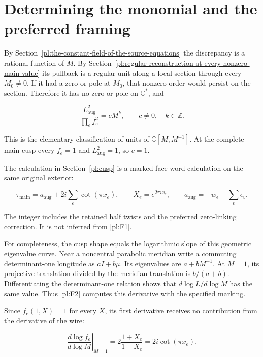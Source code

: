 \section{Determining the monomial and the preferred framing}\label{pl:determining-the-monomial-and-the-preferred-framing}

By Section~\ref{pl:the-constant-field-of-the-source-equations} the discrepancy is a rational function of \(M\).
By Section~\ref{pl:regular-reconstruction-at-every-nonzero-main-value} its pullback is a regular unit along a local section
through every \(M_0\ne0\). If it had a zero or pole at \(M_0\),
that nonzero order would persist on the section. Therefore it has
no zero or pole on \(\mathbb C^*\), and

\begin{equation}\label{pl:F1}
\frac{L_{\mathrm{aug}}^2}{\prod_e f_e^2}=cM^k,\qquad
                  c\ne0,\quad k\in\mathbb Z.
\end{equation}

This is the elementary classification of units of
\(\mathbb C[M,M^{-1}]\). At the complete main cusp every
\(f_e=1\) and \(L_{\mathrm{aug}}^2=1\), so \(c=1\).

The calculation in Section~\ref{pl:cusp} is a marked face-word calculation on the same original exterior:

\begin{equation}\label{pl:F2}
\tau_{\mathrm{main}}
      =a_{\mathrm{aug}}+2i\sum_e\cot(\pi x_e),\qquad
 X_e=e^{2\pi ix_e},\qquad
 a_{\mathrm{aug}}=-w_\epsilon-\sum_v\epsilon_v.
\end{equation}

The integer includes the retained half twists and the preferred
zero-linking correction. It is not inferred from \eqref{pl:F1}.

For completeness, the cusp shape equals the logarithmic slope
of this geometric eigenvalue curve. Near a noncentral parabolic
meridian write a commuting determinant-one longitude as
\(aI+b\mu\). Its eigenvalues are \(a+bM^{\pm1}\).
At \(M=1\), its projective translation divided by the
meridian translation is \(b/(a+b)\). Differentiating the
determinant-one relation shows that
\(d\log L/d\log M\) has the same value. Thus \eqref{pl:F2}
computes this derivative with the specified marking.

Since \(f_e(1,X)=1\) for every \(X\), its first
derivative receives no contribution from the derivative
of the wire:

\begin{equation}\label{pl:F3}
\left.\frac{d\log f_e}{d\log M}\right|_{M=1}
       =2\frac{1+X_e}{1-X_e}
       =2i\cot(\pi x_e).
\end{equation}

